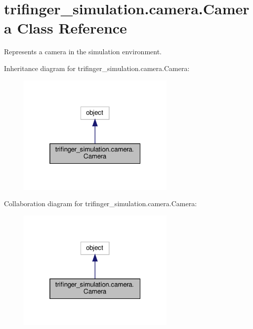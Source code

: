 \hypertarget{classtrifinger__simulation_1_1camera_1_1Camera}{}\section{trifinger\+\_\+simulation.\+camera.\+Camera Class Reference}
\label{classtrifinger__simulation_1_1camera_1_1Camera}


Represents a camera in the simulation environment.  




Inheritance diagram for trifinger\+\_\+simulation.\+camera.\+Camera\+:
\nopagebreak
\begin{figure}[H]
\begin{center}
\leavevmode
\includegraphics[width=217pt]{classtrifinger__simulation_1_1camera_1_1Camera__inherit__graph}
\end{center}
\end{figure}


Collaboration diagram for trifinger\+\_\+simulation.\+camera.\+Camera\+:
\nopagebreak
\begin{figure}[H]
\begin{center}
\leavevmode
\includegraphics[width=217pt]{classtrifinger__simulation_1_1camera_1_1Camera__coll__graph}
\end{center}
\end{figure}
